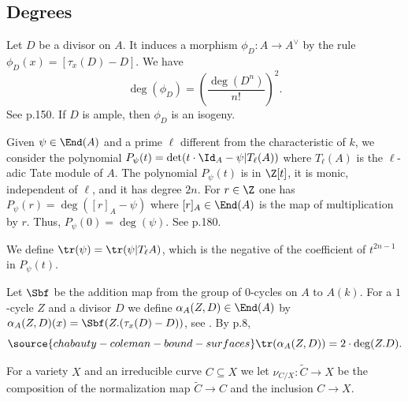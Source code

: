 \subsection{Degrees} Let $D$ be a divisor on $A$. It induces a morphism $\phi_D: A\to A^\vee$ by the rule $\phi_D(x) = [\tau_x(D)-D]$. We have
$$
\deg(\phi_D)= \left(\frac{\deg(D^n)}{n!}\right)^2.
$$
See \cite{Mumford} p.150. If $D$ is ample, then $\phi_D$ is an isogeny.

Given $\psi\in \End(A)$ and a prime $\ell$ different from the characteristic of $k$, we consider the polynomial $P_\psi(t)=\det(t\cdot \Id_A-\psi | T_\ell (A))$ where $T_\ell(A)$ is the $\ell$-adic Tate module of $A$. The polynomial $P_\psi(t)$ is in $\Z[t]$, it is monic, independent of $\ell$, and it has degree $2n$. For $r\in \Z$ one has $P_\psi(r)=\deg([r]_A -\psi)$ where $[r]_A\in \End(A)$ is the map of multiplication by $r$. Thus, $P_\psi(0)=\deg(\psi)$. See \cite{Mumford} p.180.

We define $\tr(\psi)=\tr(\psi| T_\ell A)$, which is the negative of the coefficient of $t^{2n-1}$ in $P_\psi(t)$.


Let $\Sbf$ be the addition map from the group of $0$-cycles on $A$ to $A(k)$. For a $1$-cycle $Z$ and a divisor $D$ we define $\alpha_A(Z,D)\in \End(A)$ by $\alpha_A(Z,D)(x)=\Sbf(Z.(\tau_x(D)-D))$, see \cite{Morikawa,Matsusaka}. By \cite{Matsusaka} p.8,
\begin{equation}\label{EqnTrAlpha}
\source{chabauty-coleman-bound-surfaces}
\tr(\alpha_A(Z,D)) = 2\cdot \deg(Z.D).
\end{equation}

For a variety $X$ and an irreducible curve $C\subseteq X$ we let $\nu_{C/X}: \widetilde{C}\to X$ be the composition of the normalization map $\widetilde{C}\to C$ and the inclusion $C\to X$.


